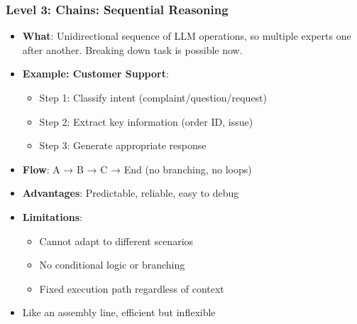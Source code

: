 \begin{frame}[fragile]\frametitle{Level 3: Chains: Sequential Reasoning}
      \begin{itemize}
        \item \textbf{What}: Unidirectional sequence of LLM operations, so multiple experts one after another. Breaking down task is possible now.
        \item \textbf{Example: Customer Support}:
        \begin{itemize}
            \item Step 1: Classify intent (complaint/question/request)
            \item Step 2: Extract key information (order ID, issue)
            \item Step 3: Generate appropriate response
        \end{itemize}
        \item \textbf{Flow}: A → B → C → End (no branching, no loops)
        \item \textbf{Advantages}: Predictable, reliable, easy to debug
        \item \textbf{Limitations}: 
        \begin{itemize}
            \item Cannot adapt to different scenarios
            \item No conditional logic or branching
            \item Fixed execution path regardless of context
        \end{itemize}
        \item Like an assembly line, efficient but inflexible
      \end{itemize}
\end{frame}

